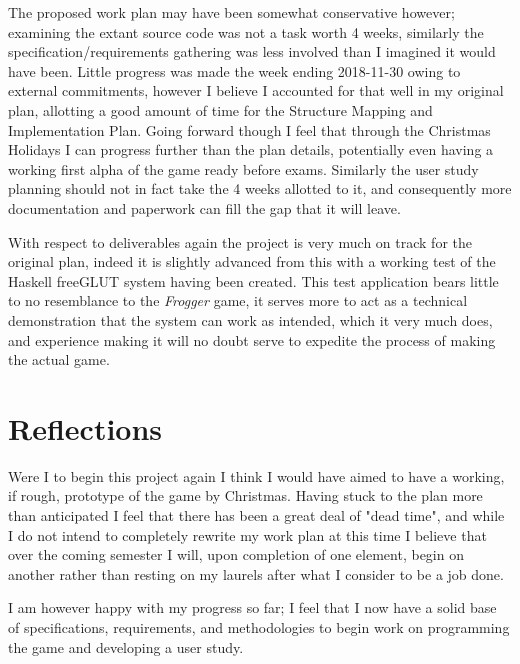 \documentclass[12pt, a4paper]{report}
\begin{document}
\par

The proposed work plan may have been somewhat conservative however; examining the extant source code was not a task worth 4 weeks, similarly the specification/requirements gathering was less involved than I imagined it would have been.
Little progress was made the week ending 2018-11-30 owing to external commitments, however I believe I accounted for that well in my original plan, allotting a good amount of time for the Structure Mapping and Implementation Plan.
Going forward though I feel that through the Christmas Holidays I can progress further than the plan details, potentially even having a working first alpha of the game ready before exams.
Similarly the user study planning should not in fact take the 4 weeks allotted to it, and consequently more documentation and paperwork can fill the gap that it will leave.

\par

With respect to deliverables again the project is very much on track for the original plan, indeed it is slightly advanced from this with a working test of the Haskell freeGLUT system having been created.
This test application bears little to no resemblance to the \textit{Frogger} game, it serves more to act as a technical demonstration that the system can work as intended, which it very much does, and experience making it will no doubt serve to expedite the process of making the actual game.

\section{Reflections}
Were I to begin this project again I think I would have aimed to have a working, if rough, prototype of the game by Christmas.
Having stuck to the plan more than anticipated I feel that there has been a great deal of "dead time", and while I do not intend to completely rewrite my work plan at this time I believe that over the coming semester I will, upon completion of one element, begin on another rather than resting on my laurels after what I consider to be a job done.

\par

I am however happy with my progress so far; I feel that I now have a solid base of specifications, requirements, and methodologies to begin work on programming the game and developing a user study.
\end{document}
